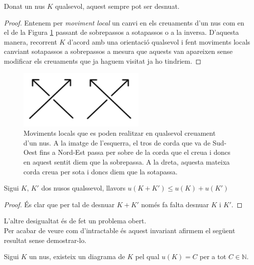 \begin{proposition}\label{prop:nombrededesnuament}
	Donat un nus $K$ qualsevol, aquest sempre pot ser desnuat.
\end{proposition}

\begin{proof}
	Entenem per \textit{moviment local} un canvi en els creuaments d'un nus com en el de la Figura \ref{fig:movimentlocal} passant de sobrepassos a sotapassos o a la inversa. D'aquesta manera, recorrent $K$ d'acord amb una orientació qualsevol i fent moviments locals canviant sotapassos a sobrepassos a mesura que aquests van apareixen sense modificar els creuaments que ja haguem visitat ja ho tindriem.
\end{proof}

\begin{figure}
	\centering
	\includegraphics[width=0.6\linewidth]{img/movimentlocal.png}
	\caption{Moviments locals que es poden realitzar en qualsevol creuament d'un nus. A la imatge de l'esquerra, el tros de corda que va de  Sud-Oest fins a Nord-Est passa per sobre de la corda que el creua i doncs en aquest sentit diem que la sobrepassa. A la dreta, aquesta mateixa corda creua per sota i doncs diem que la sotapassa.}\label{fig:movimentlocal}
\end{figure}

\begin{proposition}
	Sigui $K$, $K'$ dos nusos qualssevol, llavors $u(K+K')\leq u(K)+u(K')$
\end{proposition}

\begin{proof}
	És clar que per tal de desnuar $K+K'$ només fa falta desnuar $K$ i $K'$.
\end{proof}

L'altre desigualtat és de fet un problema obert.\\

Per acabar de veure com d'intractable és aquest invariant afirmem el següent resultat sense demostrar-lo.

\begin{proposition}
	Sigui $K$ un nus, existeix un diagrama de $K$ pel qual $u(K)=C$ per a tot $C\in\mathbb{N}$.
\end{proposition}

